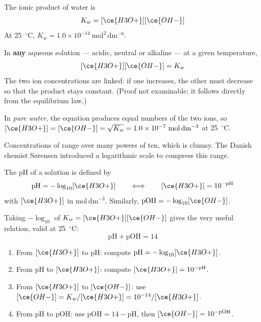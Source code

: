 \documentclass[11pt]{article}
\newcommand{\cle}[1]{{\popxbold\color{popdark}#1}}
\newcounter{popsec}
\newcounter{popsub}
\newcommand{\courssub}[1]{%
  \stepcounter{popsub}%
  \par\vspace{9pt}\noindent{\popxbold\fontsize{11.5}{13}\selectfont\color{popink}{\color{poporange}\thepopsec.\thepopsub}\hspace{6pt}#1}\par\nopagebreak\vspace{4pt}
}
\begin{document}
\begin{definition}
The \cle{ionic product of water} is
\[
K_w = [\ce{H3O+}][\ce{OH-}]
\]
At \SI{25}{\ensuremath{{}^{\circ}\mathrm{C}}}, $K_w = 1.0\times 10^{-14}\ \mathrm{mol^2\,dm^{-6}}$.
\end{definition}

\begin{propriete}
In \textbf{any} aqueous solution --- acidic, neutral or alkaline --- at a given temperature,
\[
[\ce{H3O+}][\ce{OH-}] = K_w
\]
The two ion concentrations are linked: if one increases, the other must decrease so that the product stays constant. (Proof not examinable; it follows directly from the equilibrium law.)
\end{propriete}

In \emph{pure water}, the equation produces equal numbers of the two ions, so $[\ce{H3O+}] = [\ce{OH-}] = \sqrt{K_w} = 1.0\times 10^{-7}\ \mathrm{mol\,dm^{-3}}$ at \SI{25}{\ensuremath{{}^{\circ}\mathrm{C}}}.

\courssub{The pH scale}

Concentrations of  range over many powers of ten, which is clumsy. The Danish chemist Sørensen introduced a logarithmic scale to compress this range.

\begin{definition}[pH]
The \cle{pH} of a solution is defined by
\[
\mathrm{pH} = -\log_{10}[\ce{H3O+}] \qquad \Longleftrightarrow \qquad [\ce{H3O+}] = 10^{-\mathrm{pH}}
\]
with $[\ce{H3O+}]$ in $\mathrm{mol\,dm^{-3}}$. Similarly, $\mathrm{pOH} = -\log_{10}[\ce{OH-}]$.
\end{definition}

Taking $-\log_{10}$ of $K_w = [\ce{H3O+}][\ce{OH-}]$ gives the very useful relation, valid at \SI{25}{\ensuremath{{}^{\circ}\mathrm{C}}}:
\[
\mathrm{pH} + \mathrm{pOH} = 14
\]

\begin{methode}
\begin{enumerate}
\item From $[\ce{H3O+}]$ to pH: compute $\mathrm{pH} = -\log_{10}[\ce{H3O+}]$.
\item From pH to $[\ce{H3O+}]$: compute $[\ce{H3O+}] = 10^{-\mathrm{pH}}$.
\item From $[\ce{H3O+}]$ to $[\ce{OH-}]$: use $[\ce{OH-}] = K_w/[\ce{H3O+}] = 10^{-14}/[\ce{H3O+}]$.
\item From pH to pOH: use $\mathrm{pOH} = 14 - \mathrm{pH}$, then $[\ce{OH-}] = 10^{-\mathrm{pOH}}$.
\end{enumerate}
\end{methode}
\end{document}
